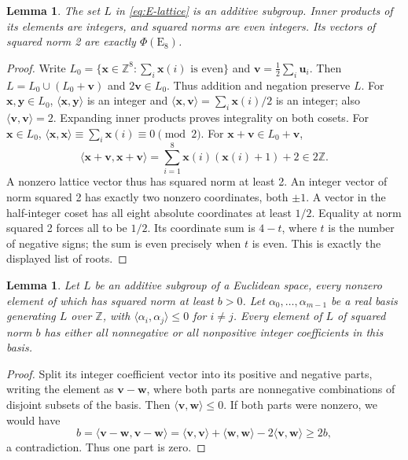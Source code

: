 \documentclass[11pt]{amsart}
\newcommand\ints{{\mathbb Z}}
\newcommand\Zu{{\mathbf u}}
\newcommand\Zv{{\mathbf v}}
\newcommand\Zw{{\mathbf w}}
\newcommand\Zy{{\mathbf y}}
\newcommand\Zx{{\mathbf x}}
\newcommand\ip[2]{\langle#1,#2\rangle}
\newtheorem{lemma}[theorem]{Lemma}
\theoremstyle{definition}
\newcommand{\typ}[1]{\mathrm{#1}}
\newcommand{\lsq}[1]{\ip{#1}{#1}}
\begin{document}
\begin{lemma}\label{lem:even-lattice}
The set $L$ in \eqref{eq:E-lattice} is an additive subgroup. Inner products
of its elements are integers, and squared norms are even integers. Its
vectors of squared norm 2 are exactly $\Phi(\typ E_8)$.
\end{lemma}
\begin{proof}
Write $L_0=\{\Zx\in\ints^8:\sum_i\Zx(i)\text{ is even}\}$ and
$\Zv=\tfrac12\sum_i\Zu_i$. Then $L=L_0\cup(L_0+\Zv)$
and $2\Zv\in L_0$. Thus addition and negation preserve $L$.
For $\Zx,\Zy\in L_0$, $\ip{\Zx}{\Zy}$ is an integer and
$\ip{\Zx}{\Zv}=\sum_i\Zx(i)/2$ is an integer; also $\lsq{\Zv}=2$.
Expanding inner products proves integrality on both cosets.
For $\Zx\in L_0$,
$\lsq{\Zx}\equiv\sum_i\Zx(i)\equiv0\pmod2$.
For $\Zx+\Zv\in L_0+\Zv$,
\[
 \lsq{\Zx+\Zv}=\sum_{i=1}^8\Zx(i)(\Zx(i)+1)+2\in2\ints.
\]
A nonzero lattice vector thus has squared norm at least 2. An integer
vector of norm squared 2 has exactly two nonzero coordinates, both $\pm1$.
A vector in the half-integer coset has all eight absolute coordinates at
least $1/2$. Equality at norm squared 2 forces all to be $1/2$.
Its coordinate sum is $4-t$, where $t$ is the number of negative signs;
the sum is even precisely when $t$ is even. This is exactly the displayed
list of roots.
\end{proof}

\begin{lemma}\label{lem:minimal-base}
Let $L$ be an additive subgroup of a Euclidean space, every nonzero element
of which has squared norm at least $b>0$. Let
$\alpha_0,\ldots,\alpha_{m-1}$ be a real basis generating $L$ over
$\ints$, with $\ip{\alpha_i}{\alpha_j}\leq0$ for $i\ne j$.
Every element of $L$ of squared norm $b$ has either all nonnegative or
all nonpositive integer coefficients in this basis.
\end{lemma}
\begin{proof}
Split its integer coefficient vector into its positive and negative parts,
writing the element as $\Zv-\Zw$, where both parts are nonnegative
combinations of disjoint subsets of the basis. Then
$\ip{\Zv}{\Zw}\leq0$. If both parts were nonzero, we would have
\[
 b=\lsq{\Zv-\Zw}=\lsq{\Zv}+\lsq{\Zw}-2\ip{\Zv}{\Zw}\geq2b,
\]
a contradiction. Thus one part is zero.
\end{proof}
\end{document}
